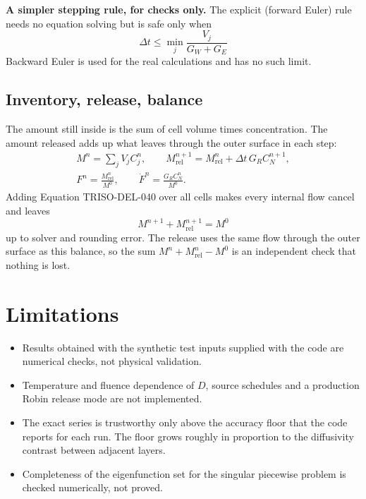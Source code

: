 \documentclass[11pt]{article}
\begin{document}
\textbf{A simpler stepping rule, for checks only.} The explicit (forward Euler) rule needs no equation solving but is safe only when
\begin{equation}
\boxed{\Delta t\le\min_j\frac{V_j}{G_W+G_E}}
\tag{TRISO-FV-300}
\end{equation}
Backward Euler is used for the real calculations and has no such limit.

\subsection{Inventory, release, balance}
The amount still inside is the sum of cell volume times concentration. The amount released adds up what leaves through the outer surface in each step:
\[
\begin{gathered}
M^n=\sum_jV_jC_j^n,\qquad M_{\mathrm{rel}}^{n+1}=M_{\mathrm{rel}}^n+\Delta t\,G_RC_N^{n+1},\\
F^n=\frac{M_{\mathrm{rel}}^n}{M^0},\qquad \dot F^n=\frac{G_RC_N^n}{M^0}.
\end{gathered}
\]
Adding Equation TRISO-DEL-040 over all cells makes every internal flow cancel and leaves
\[
M^{n+1}+M_{\mathrm{rel}}^{n+1}=M^0
\]
up to solver and rounding error. The release uses the same flow through the outer surface as this balance, so the sum $M^n+M_{\mathrm{rel}}^n-M^0$ is an independent check that nothing is lost.

\section{Limitations}
\begin{itemize}
\item Results obtained with the synthetic test inputs supplied with the code are numerical checks, not physical validation.
\item Temperature and fluence dependence of $D$, source schedules and a production Robin release mode are not implemented.
\item The exact series is trustworthy only above the accuracy floor that the code reports for each run. The floor grows roughly in proportion to the diffusivity contrast between adjacent layers.
\item Completeness of the eigenfunction set for the singular piecewise problem is checked numerically, not proved.
\end{itemize}
\end{document}
